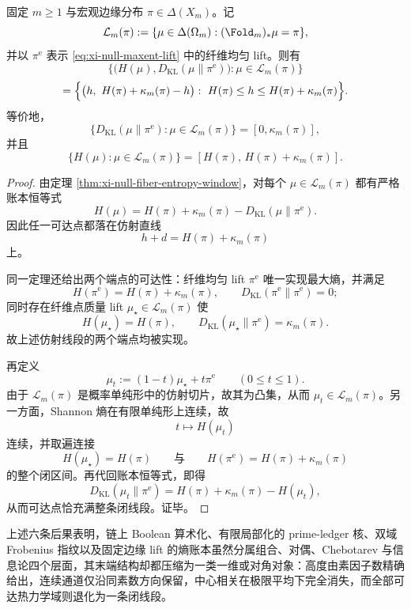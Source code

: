 \begin{theorem}\label{thm:xi-time-part9zl-lift-entropy-kl-line-segment}
固定 \(m\ge 1\) 与宏观边缘分布 \(\pi\in\Delta(X_m)\)。记
\[
\mathcal L_m(\pi)
:=
\{\mu\in\Delta(\Omega_m):(\Fold_m)_*\mu=\pi\},
\]
并以 \(\pi^{\mathrm e}\) 表示 \eqref{eq:xi-null-maxent-lift} 中的纤维均匀 lift。则有
\[
\bigl\{
\bigl(H(\mu),D_{\mathrm{KL}}(\mu\|\pi^{\mathrm e})\bigr):
\mu\in\mathcal L_m(\pi)
\bigr\}
\]
\[
=
\Bigl\{
\bigl(h,\ H(\pi)+\kappa_m(\pi)-h\bigr):
\ H(\pi)\le h\le H(\pi)+\kappa_m(\pi)
\Bigr\}.
\]
等价地，
\[
\{D_{\mathrm{KL}}(\mu\|\pi^{\mathrm e}):\mu\in\mathcal L_m(\pi)\}
=
[0,\kappa_m(\pi)],
\]
并且
\[
\{H(\mu):\mu\in\mathcal L_m(\pi)\}
=
[H(\pi),\,H(\pi)+\kappa_m(\pi)].
\]
\end{theorem}
\begin{proof}
由定理 \ref{thm:xi-null-fiber-entropy-window}，对每个 \(\mu\in\mathcal L_m(\pi)\) 都有严格账本恒等式
\[
H(\mu)=H(\pi)+\kappa_m(\pi)-D_{\mathrm{KL}}(\mu\|\pi^{\mathrm e}).
\]
因此任一可达点都落在仿射直线
\[
h+d=H(\pi)+\kappa_m(\pi)
\]
上。

同一定理还给出两个端点的可达性：纤维均匀 lift \(\pi^{\mathrm e}\) 唯一实现最大熵，并满足
\[
H(\pi^{\mathrm e})=H(\pi)+\kappa_m(\pi),
\qquad
D_{\mathrm{KL}}(\pi^{\mathrm e}\|\pi^{\mathrm e})=0;
\]
同时存在纤维点质量 lift \(\mu_\star\in\mathcal L_m(\pi)\) 使
\[
H(\mu_\star)=H(\pi),
\qquad
D_{\mathrm{KL}}(\mu_\star\|\pi^{\mathrm e})=\kappa_m(\pi).
\]
故上述仿射线段的两个端点均被实现。

再定义
\[
\mu_t:=(1-t)\mu_\star+t\pi^{\mathrm e}
\qquad(0\le t\le 1).
\]
由于 \(\mathcal L_m(\pi)\) 是概率单纯形中的仿射切片，故其为凸集，从而 \(\mu_t\in\mathcal L_m(\pi)\)。另一方面，Shannon 熵在有限单纯形上连续，故
\[
t\longmapsto H(\mu_t)
\]
连续，并取遍连接
\[
H(\mu_\star)=H(\pi)
\qquad\text{与}\qquad
H(\pi^{\mathrm e})=H(\pi)+\kappa_m(\pi)
\]
的整个闭区间。再代回账本恒等式，即得
\[
D_{\mathrm{KL}}(\mu_t\|\pi^{\mathrm e})
=
H(\pi)+\kappa_m(\pi)-H(\mu_t),
\]
从而可达点恰充满整条闭线段。证毕。
\end{proof}

上述六条后果表明，链上 Boolean 算术化、有限局部化的 prime-ledger 核、双域 Frobenius 指纹以及固定边缘 lift 的熵账本虽然分属组合、对偶、Chebotarev 与信息论四个层面，其末端结构却都压缩为一类一维或对角对象：高度由素因子数精确给出，连续通道仅沿同素数方向保留，中心相关在极限平均下完全消失，而全部可达热力学域则退化为一条闭线段。
